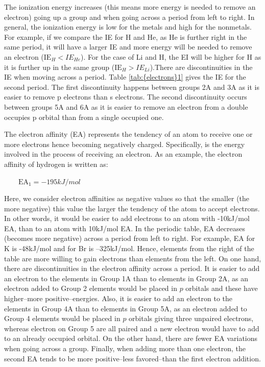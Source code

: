 \documentclass[main.tex]{subfiles}
\newcommand\chapterlabel{electrons}
\begin{document}
\begin{description}
 
The ionization energy increases (this means more energy is needed to remove an electron) going up a group and when going across a period from left to right. In general, the ionization energy is low for the metals and high for the nonmetals. For example, if we compare the IE for H and He, as He is further right in the same period, it will have a larger IE and more energy will be needed to remove an electron ($\text{IE}_{H}<IE_{He}$). For the case of Li and H, the EI will be higher for H as it is further up in the same group ($\text{IE}_{H}>IE_{Li}$).There are discontinuities in the IE when moving across a period. Table \ref{tab:{\chapterlabel}1} gives the IE for the second period. The first discontinuity happens between groups 2A and 3A as it is easier to remove p electrons than s electrons. The second discontinuity occurs between groups 5A and 6A as it is easier to remove an electron from a double occupies p orbital than from a single occupied one.
\item[\docfilehook{Electron affinity}{}] 
The electron affinity (EA) represents the tendency of an atom to receive one or more electrons hence becoming negatively charged.  Specifically, is the energy involved in the process of receiving an electron. As an example, the electron affinity of hydrogen is written as:
\begin{center} $\qquad   \text{EA}_1= -195kJ/mol$  \end{center}
Here, we consider electron affinities as negative values so that the smaller (the more negative) this value the larger the tendency of the atom to accept electrons. In other words, it would be easier to add electrons to an atom with -10kJ/mol EA, than to an atom with 10kJ/mol EA. In the periodic table, EA decreases (becomes more negative) across a period from left to right. For example, EA for K is -48kJ/mol and for Br is --325kJ/mol. Hence, elements from the right of the table are more willing to gain electrons than elements from the left. On one hand, there are discontinuities in the electron affinity across a period. It is easier to add an electron to the elements in Group 1A than to elements in Group 2A, as an electron added to Group 2 elements would be placed in $p$ orbitals and these have higher--more positive--energies. Also, it is easier to add an electron to the elements in Group 4A than to elements in Group 5A, as an electron added to Group 4 elements would be placed in $p$ orbitals giving three unpaired electrons, whereas electron on Group 5 are all paired and a new electron would have to add to an already occupied orbital. On the other hand, there are fewer EA variations when going across a group. Finally, when adding more than one electron, the second EA tends to be more positive--less favored--than the first electron addition.
       \label{Fig:{\chapterlabel}\thefigurenewcounter}
 \vspace{1cm}\hspace{0cm}\begin{minipage}[b]{1.5\linewidth}


\end{minipage}
\end{description}
\end{document}
